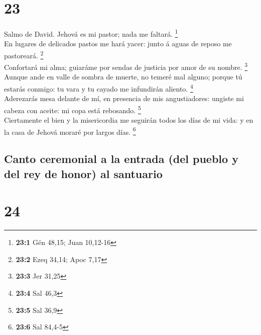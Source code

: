 \hypertarget{section-22}{%
\section{23}\label{section-22}}

 Salmo de David. Jehová es mi pastor; nada me faltará.
\footnote{\textbf{23:1} Gén 48,15; Juan 10,12-16}\\
 En lugares de delicados pastos me hará yacer: junto á aguas
de reposo me pastoreará. \footnote{\textbf{23:2} Ezeq 34,14; Apoc 7,17}\\
 Confortará mi alma; guiaráme por sendas de justicia por
amor de su nombre. \footnote{\textbf{23:3} Jer 31,25}\\
 Aunque ande en valle de sombra de muerte, no temeré mal
alguno; porque tú estarás conmigo: tu vara y tu cayado me infundirán
aliento. \footnote{\textbf{23:4} Sal 46,3}\\
 Aderezarás mesa delante de mí, en presencia de mis
angustiadores: ungiste mi cabeza con aceite: mi copa está rebosando.
\footnote{\textbf{23:5} Sal 36,9}\\
 Ciertamente el bien y la misericordia me seguirán todos los
días de mi vida: y en la casa de Jehová moraré por largos días.
\footnote{\textbf{23:6} Sal 84,4-5}

\hypertarget{canto-ceremonial-a-la-entrada-del-pueblo-y-del-rey-de-honor-al-santuario}{%
\subsection{Canto ceremonial a la entrada (del pueblo y del rey de
honor) al
santuario}\label{canto-ceremonial-a-la-entrada-del-pueblo-y-del-rey-de-honor-al-santuario}}

\hypertarget{section-23}{%
\section{24}\label{section-23}}

